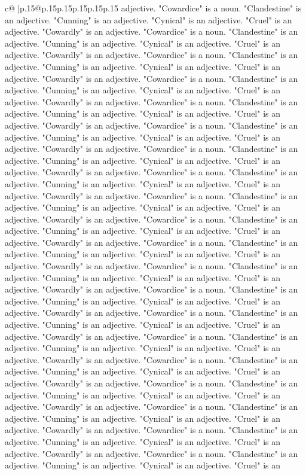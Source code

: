 \documentclass{article}
\begin{document}
{\begin{supertabular}{c@{$\;$}|p{.15\linewidth}@{}p{.15\linewidth}p{.15\linewidth}p{.15\linewidth}p{.15\linewidth}p{.15\linewidth}}
{{{adjective. "Cowardice" is a noun. "Clandestine" is an adjective. "Cunning" is an adjective. "Cynical" is an adjective. "Cruel" is an adjective. "Cowardly" is an adjective. "Cowardice" is a noun. "Clandestine" is an adjective. "Cunning" is an adjective. "Cynical" is an adjective. "Cruel" is an adjective. "Cowardly" is an adjective. "Cowardice" is a noun. "Clandestine" is an adjective. "Cunning" is an adjective. "Cynical" is an adjective. "Cruel" is an adjective. "Cowardly" is an adjective. "Cowardice" is a noun. "Clandestine" is an adjective. "Cunning" is an adjective. "Cynical" is an adjective. "Cruel" is an adjective. "Cowardly" is an adjective. "Cowardice" is a noun. "Clandestine" is an adjective. "Cunning" is an adjective. "Cynical" is an adjective. "Cruel" is an adjective. "Cowardly" is an adjective. "Cowardice" is a noun. "Clandestine" is an adjective. "Cunning" is an adjective. "Cynical" is an adjective. "Cruel" is an adjective. "Cowardly" is an adjective. "Cowardice" is a noun. "Clandestine" is an adjective. "Cunning" is an adjective. "Cynical" is an adjective. "Cruel" is an adjective. "Cowardly" is an adjective. "Cowardice" is a noun. "Clandestine" is an adjective. "Cunning" is an adjective. "Cynical" is an adjective. "Cruel" is an adjective. "Cowardly" is an adjective. "Cowardice" is a noun. "Clandestine" is an adjective. "Cunning" is an adjective. "Cynical" is an adjective. "Cruel" is an adjective. "Cowardly" is an adjective. "Cowardice" is a noun. "Clandestine" is an adjective. "Cunning" is an adjective. "Cynical" is an adjective. "Cruel" is an adjective. "Cowardly" is an adjective. "Cowardice" is a noun. "Clandestine" is an adjective. "Cunning" is an adjective. "Cynical" is an adjective. "Cruel" is an adjective. "Cowardly" is an adjective. "Cowardice" is a noun. "Clandestine" is an adjective. "Cunning" is an adjective. "Cynical" is an adjective. "Cruel" is an adjective. "Cowardly" is an adjective. "Cowardice" is a noun. "Clandestine" is an adjective. "Cunning" is an adjective. "Cynical" is an adjective. "Cruel" is an adjective. "Cowardly" is an adjective. "Cowardice" is a noun. "Clandestine" is an adjective. "Cunning" is an adjective. "Cynical" is an adjective. "Cruel" is an adjective. "Cowardly" is an adjective. "Cowardice" is a noun. "Clandestine" is an adjective. "Cunning" is an adjective. "Cynical" is an adjective. "Cruel" is an adjective. "Cowardly" is an adjective. "Cowardice" is a noun. "Clandestine" is an adjective. "Cunning" is an adjective. "Cynical" is an adjective. "Cruel" is an adjective. "Cowardly" is an adjective. "Cowardice" is a noun. "Clandestine" is an adjective. "Cunning" is an adjective. "Cynical" is an adjective. "Cruel" is an adjective. "Cowardly" is an adjective. "Cowardice" is a noun. "Clandestine" is an adjective. "Cunning" is an adjective. "Cynical" is an adjective. "Cruel" is an adjective. "Cowardly" is an adjective. "Cowardice" is a noun. "Clandestine" is an adjective. "Cunning" is an adjective. "Cynical" is an adjective. "Cruel" is an adjective. "Cowardly" is an adjective. "Cowardice" is a noun. "Clandestine" is an adjective. "Cunning" is an adjective. "Cynical" is an adjective. "Cruel" is an }}}
\end{supertabular}}
\end{document}
